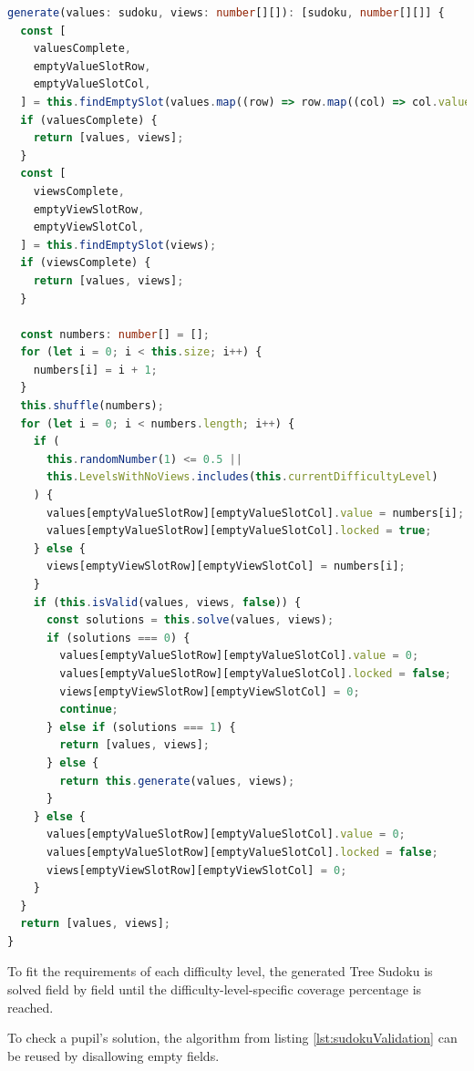\begin{lstlisting}[language=TypeScript,caption={Generation algorithm for a Tree Sudoku instance},label={lst:sudokuGenerator}]
generate(values: sudoku, views: number[][]): [sudoku, number[][]] {
  const [
    valuesComplete,
    emptyValueSlotRow,
    emptyValueSlotCol,
  ] = this.findEmptySlot(values.map((row) => row.map((col) => col.value)));
  if (valuesComplete) {
    return [values, views];
  }
  const [
    viewsComplete,
    emptyViewSlotRow,
    emptyViewSlotCol,
  ] = this.findEmptySlot(views);
  if (viewsComplete) {
    return [values, views];
  }

  const numbers: number[] = [];
  for (let i = 0; i < this.size; i++) {
    numbers[i] = i + 1;
  }
  this.shuffle(numbers);
  for (let i = 0; i < numbers.length; i++) {
    if (
      this.randomNumber(1) <= 0.5 ||
      this.LevelsWithNoViews.includes(this.currentDifficultyLevel)
    ) {
      values[emptyValueSlotRow][emptyValueSlotCol].value = numbers[i];
      values[emptyValueSlotRow][emptyValueSlotCol].locked = true;
    } else {
      views[emptyViewSlotRow][emptyViewSlotCol] = numbers[i];
    }
    if (this.isValid(values, views, false)) {
      const solutions = this.solve(values, views);
      if (solutions === 0) {
        values[emptyValueSlotRow][emptyValueSlotCol].value = 0;
        values[emptyValueSlotRow][emptyValueSlotCol].locked = false;
        views[emptyViewSlotRow][emptyViewSlotCol] = 0;
        continue;
      } else if (solutions === 1) {
        return [values, views];
      } else {
        return this.generate(values, views);
      }
    } else {
      values[emptyValueSlotRow][emptyValueSlotCol].value = 0;
      values[emptyValueSlotRow][emptyValueSlotCol].locked = false;
      views[emptyViewSlotRow][emptyViewSlotCol] = 0;
    }
  }
  return [values, views];
}
\end{lstlisting}

To fit the requirements of each difficulty level, the generated Tree Sudoku is solved field by field until the difficulty-level-specific coverage percentage is reached.

To check a pupil's solution, the algorithm from listing \ref{lst:sudokuValidation} can be reused by disallowing empty fields.
